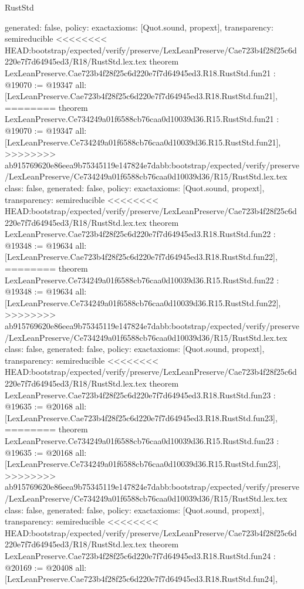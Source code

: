 \begin{lexlean}{RustStd}
\begin{coremodule}
{\begin{coremodule}
{{{{{{{{{{{{{{{{{{{{{{{{  generated: false,
  policy: exact{axioms: [Quot.sound, propext]},
  transparency: semireducible
}
<<<<<<<< HEAD:bootstrap/expected/verify/preserve/LexLeanPreserve/Cae723b4f28f25c6d220e7f7d64945ed3/R18/RustStd.lex.tex
theorem LexLeanPreserve.Cae723b4f28f25c6d220e7f7d64945ed3.R18.RustStd.fun21 : @19070 := @19347 {
  all: [LexLeanPreserve.Cae723b4f28f25c6d220e7f7d64945ed3.R18.RustStd.fun21],
========
theorem LexLeanPreserve.Ce734249a01f6588cb76caa0d10039d36.R15.RustStd.fun21 : @19070 := @19347 {
  all: [LexLeanPreserve.Ce734249a01f6588cb76caa0d10039d36.R15.RustStd.fun21],
>>>>>>>> ab915769620e86eea9b75345119e147824e7dabb:bootstrap/expected/verify/preserve/LexLeanPreserve/Ce734249a01f6588cb76caa0d10039d36/R15/RustStd.lex.tex
  class: false,
  generated: false,
  policy: exact{axioms: [Quot.sound, propext]},
  transparency: semireducible
}
<<<<<<<< HEAD:bootstrap/expected/verify/preserve/LexLeanPreserve/Cae723b4f28f25c6d220e7f7d64945ed3/R18/RustStd.lex.tex
theorem LexLeanPreserve.Cae723b4f28f25c6d220e7f7d64945ed3.R18.RustStd.fun22 : @19348 := @19634 {
  all: [LexLeanPreserve.Cae723b4f28f25c6d220e7f7d64945ed3.R18.RustStd.fun22],
========
theorem LexLeanPreserve.Ce734249a01f6588cb76caa0d10039d36.R15.RustStd.fun22 : @19348 := @19634 {
  all: [LexLeanPreserve.Ce734249a01f6588cb76caa0d10039d36.R15.RustStd.fun22],
>>>>>>>> ab915769620e86eea9b75345119e147824e7dabb:bootstrap/expected/verify/preserve/LexLeanPreserve/Ce734249a01f6588cb76caa0d10039d36/R15/RustStd.lex.tex
  class: false,
  generated: false,
  policy: exact{axioms: [Quot.sound, propext]},
  transparency: semireducible
}
<<<<<<<< HEAD:bootstrap/expected/verify/preserve/LexLeanPreserve/Cae723b4f28f25c6d220e7f7d64945ed3/R18/RustStd.lex.tex
theorem LexLeanPreserve.Cae723b4f28f25c6d220e7f7d64945ed3.R18.RustStd.fun23 : @19635 := @20168 {
  all: [LexLeanPreserve.Cae723b4f28f25c6d220e7f7d64945ed3.R18.RustStd.fun23],
========
theorem LexLeanPreserve.Ce734249a01f6588cb76caa0d10039d36.R15.RustStd.fun23 : @19635 := @20168 {
  all: [LexLeanPreserve.Ce734249a01f6588cb76caa0d10039d36.R15.RustStd.fun23],
>>>>>>>> ab915769620e86eea9b75345119e147824e7dabb:bootstrap/expected/verify/preserve/LexLeanPreserve/Ce734249a01f6588cb76caa0d10039d36/R15/RustStd.lex.tex
  class: false,
  generated: false,
  policy: exact{axioms: [Quot.sound, propext]},
  transparency: semireducible
}
<<<<<<<< HEAD:bootstrap/expected/verify/preserve/LexLeanPreserve/Cae723b4f28f25c6d220e7f7d64945ed3/R18/RustStd.lex.tex
theorem LexLeanPreserve.Cae723b4f28f25c6d220e7f7d64945ed3.R18.RustStd.fun24 : @20169 := @20408 {
  all: [LexLeanPreserve.Cae723b4f28f25c6d220e7f7d64945ed3.R18.RustStd.fun24],
}}}}}}}}}}}}}}}}}}}}}}}}}}}
\end{coremodule}}
\end{coremodule}
\end{lexlean}
